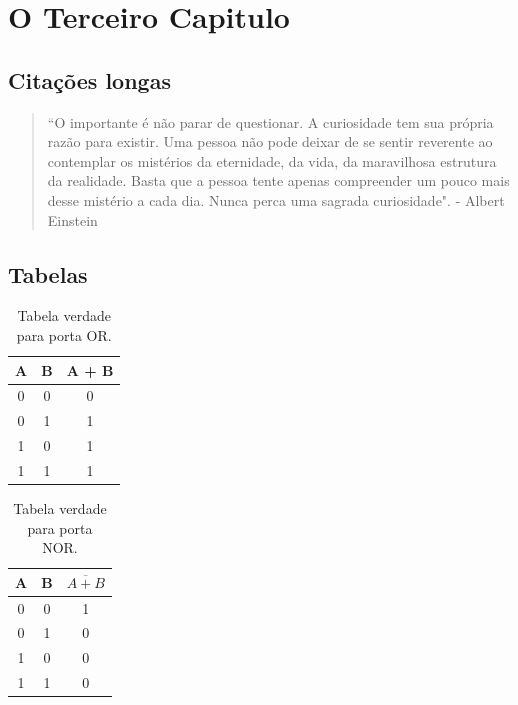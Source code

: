 \chapter{O Terceiro Capitulo}
 

\section{Citações longas}

\begin{flushright}
\begin{minipage}{0.75\textwidth} %
\begin{quotation}
``O importante é não parar de questionar. A curiosidade tem sua própria razão
para existir. Uma pessoa não pode deixar de se sentir reverente ao contemplar
os mistérios da eternidade, da vida, da maravilhosa estrutura da realidade. Basta
que a pessoa tente apenas compreender um pouco mais desse mistério a cada dia.
Nunca perca uma sagrada curiosidade". - Albert Einstein
\end{quotation}
\end{minipage}
\end{flushright}

\section{Tabelas}

\begin{table}[h]
	\centering
		\begin{tabular}{|c|c|c|}
		  \hline
			A & B & A + B \\ \hline
			0 & 0 & 0 \\ \hline
			0 & 1 & 1 \\ \hline
			1 & 0 & 1 \\ \hline
			1 & 1 & 1 \\ \hline
		\end{tabular}
		\caption{Tabela verdade para porta OR.}
\end{table}

\begin{table}[h]
	\centering
		\begin{tabular}{|c|c|c|}
		  \hline
			A & B & $\overline{A + B}$ \\ \hline
			0 & 0 & 1 \\ \hline
			0 & 1 & 0 \\ \hline
			1 & 0 & 0 \\ \hline
			1 & 1 & 0 \\ \hline
		\end{tabular}
		\caption{Tabela verdade para porta NOR.}
\end{table}

